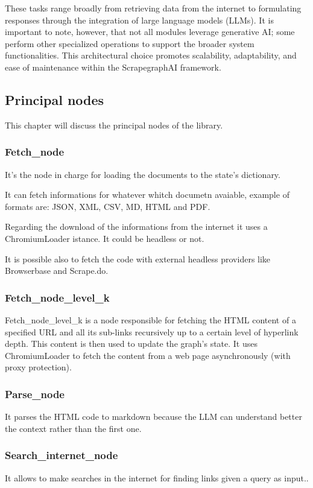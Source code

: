 These tasks range broadly from retrieving data from the internet to formulating responses through the integration of large language models (LLMs). It is important to note, however, that not all modules leverage generative AI; some perform other specialized operations to support the broader system functionalities. This architectural choice promotes scalability, adaptability, and ease of maintenance within the ScrapegraphAI  framework.
\subsection{Principal nodes}
This chapter will discuss the principal nodes of the library. 
\subsubsection{Fetch\_node}
It's the node in charge for loading the documents to the state's dictionary.

It can fetch informations for whatever whitch documetn avaiable, example of formats are: JSON, XML, CSV, MD, HTML and PDF.

Regarding the download of the informations from the internet it uses a ChromiumLoader istance. It could be headless or not.

It is possible  also to fetch the code with external headless providers like Browserbase and Scrape.do.

\subsubsection{Fetch\_node\_level\_k}
Fetch\_node\_level\_k is a node responsible for fetching the HTML content of a specified URL and all its sub-links recursively up to a certain level of hyperlink depth. This content is then used to update the graph's state. It uses ChromiumLoader to fetch the content from a web page asynchronously (with proxy protection).

\subsubsection{Parse\_node}
It parses the HTML code to markdown because the LLM can understand better the context rather than the first one.

\subsubsection{Search\_internet\_node}
It allows to make searches in the internet for finding links given a query as input..

